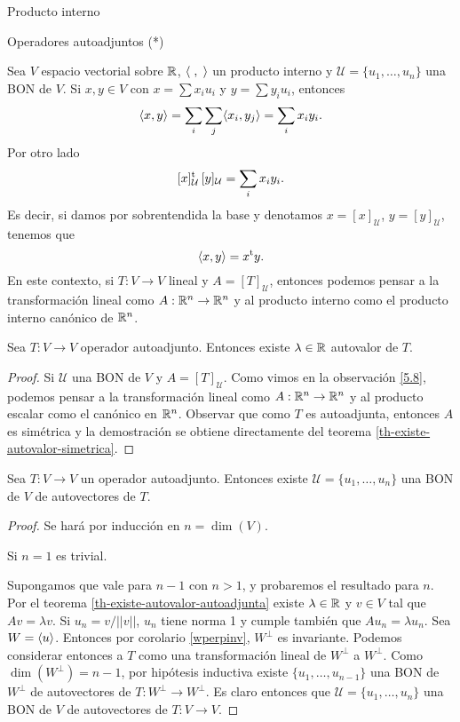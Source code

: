 \begin{chapter}{Producto interno}
\begin{section}{Operadores autoadjuntos (*)}
        \begin{obs}\label{5.8}
            Sea $V$ espacio vectorial  sobre $\mathbb R$, $\langle\;,\;\rangle$ un producto interno y $\mathcal{U} = \{u_1,\ldots,u_n\}$ una BON de $V$. Si $x,y \in V$ con $x = \sum x_iu_i$ y $y = \sum y_i u_i$, entonces
            $$
            \langle x,y\rangle = \sum_i\sum_j \langle x_i,y_j\rangle = \sum_i x_iy_i.
            $$
            Por otro lado 
            $$
            [x]_\mathcal{U}^{\operatorname{t}} \, [y]_\mathcal{U} = \sum_i x_iy_i.
            $$
            Es decir, si damos por sobrentendida la base y denotamos $x = [x]_\mathcal{U}$, $ y =[y]_\mathcal{U}$, tenemos que
            $$
            \langle x,y\rangle = x^{\operatorname{t}} y .
            $$
            En este contexto, si $T: V \to V$ lineal y $A= [T]_\mathcal{U}$, entonces podemos pensar a la transformación lineal como $A: \mathbb R^n \to \mathbb R^n$ y al producto interno como  el producto interno canónico de $\mathbb R^n$.
        \end{obs}
        
        
        
        \begin{teorema}\label{th-existe-autovalor-autoadjunta}
            Sea $T:V\to V$ operador autoadjunto. Entonces existe $\lambda \in \mathbb R$ autovalor de $T$.   
        \end{teorema}
        \begin{proof}
            Si $\mathcal{U}$ una BON de $V$ y $A = [T]_\mathcal{U}$. Como vimos  en  la observación \ref{5.8}, podemos pensar a la transformación lineal como  $A: \mathbb R^n \to \mathbb R^n$ y  al producto escalar como el canónico  en $\mathbb R^n$. Observar que como $T$ es autoadjunta, entonces $A$ es simétrica y  la demostración se obtiene directamente del teorema \ref{th-existe-autovalor-simetrica}.  
            \end{proof}
        
        \begin{teorema} Sea $T: V \to V$ un operador autoadjunto. Entonces existe $\mathcal{U} = \{u_1,\ldots,u_n\}$ una BON de $V$ de autovectores de $T$.
        \end{teorema}
        \begin{proof}
            Se hará por inducción en $n= \dim(V)$.
            
            Si $n=1$ es trivial. 
            
            Supongamos que vale  para $n-1$ con $n >1$, y  probaremos el resultado para $n$. Por el teorema  \ref{th-existe-autovalor-autoadjunta} existe $\lambda \in \mathbb R$ y $v \in V$ tal que $Av = \lambda v$. Si $u_n = v/||v||$, $u_n$ tiene norma 1 y  cumple también que $Au_n = \lambda u_n$. Sea $W = \langle u \rangle$. Entonces por  corolario \ref{wperpinv}, $W^\perp$ es invariante. Podemos considerar entonces a  $T$ como una transformación lineal de $W^\perp$ a $W^\perp$. Como $\dim(W^\perp) = n-1$, por hipótesis inductiva existe   $\{u_1,\ldots,u_{n-1}\}$ una BON de $W^\perp$ de autovectores de $T: W^\perp \to W^\perp$. Es claro entonces que $\mathcal{U} = \{u_1,\ldots,u_n\}$  una BON de $V$ de autovectores de $T:V \to V$. 
        \end{proof}
        

\end{section}
\end{chapter}
